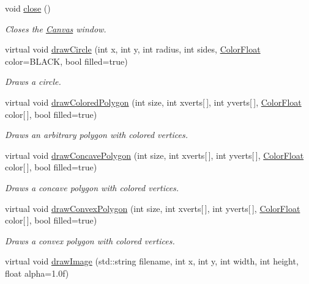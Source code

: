 \begin{DoxyCompactItemize}
void \hyperlink{classtsgl_1_1_canvas_afaa1250b1da6b48b9c170a0655191938}{close} ()
\begin{DoxyCompactList}\small\item\em Closes the \hyperlink{classtsgl_1_1_canvas}{Canvas} window. \end{DoxyCompactList}\item 
virtual void \hyperlink{classtsgl_1_1_canvas_a2162c16f6aeaee01f8e29696f5818c03}{draw\+Circle} (int x, int y, int radius, int sides, \hyperlink{structtsgl_1_1_color_float}{Color\+Float} color=B\+L\+A\+C\+K, bool filled=true)
\begin{DoxyCompactList}\small\item\em Draws a circle. \end{DoxyCompactList}\item 
virtual void \hyperlink{classtsgl_1_1_canvas_a2165615afc3cebfe38e4313c25bd17b9}{draw\+Colored\+Polygon} (int size, int xverts\mbox{[}$\,$\mbox{]}, int yverts\mbox{[}$\,$\mbox{]}, \hyperlink{structtsgl_1_1_color_float}{Color\+Float} color\mbox{[}$\,$\mbox{]}, bool filled=true)
\begin{DoxyCompactList}\small\item\em Draws an arbitrary polygon with colored vertices. \end{DoxyCompactList}\item 
virtual void \hyperlink{classtsgl_1_1_canvas_ad98cb8db661ef24279b61c4c11fd29ea}{draw\+Concave\+Polygon} (int size, int xverts\mbox{[}$\,$\mbox{]}, int yverts\mbox{[}$\,$\mbox{]}, \hyperlink{structtsgl_1_1_color_float}{Color\+Float} color\mbox{[}$\,$\mbox{]}, bool filled=true)
\begin{DoxyCompactList}\small\item\em Draws a concave polygon with colored vertices. \end{DoxyCompactList}\item 
virtual void \hyperlink{classtsgl_1_1_canvas_a9cb84248c3559c81e4cb2e0d194b2437}{draw\+Convex\+Polygon} (int size, int xverts\mbox{[}$\,$\mbox{]}, int yverts\mbox{[}$\,$\mbox{]}, \hyperlink{structtsgl_1_1_color_float}{Color\+Float} color\mbox{[}$\,$\mbox{]}, bool filled=true)
\begin{DoxyCompactList}\small\item\em Draws a convex polygon with colored vertices. \end{DoxyCompactList}\item 
virtual void \hyperlink{classtsgl_1_1_canvas_ae94a586629d20b7fabcb402d1c654628}{draw\+Image} (std\+::string filename, int x, int y, int width, int height, float alpha=1.\+0f)

\end{DoxyCompactItemize}
